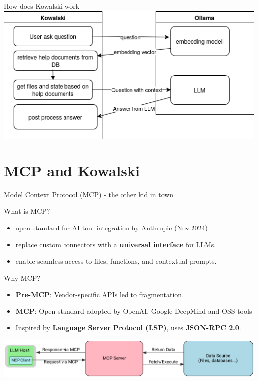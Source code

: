 \documentclass[aspectratio=169]{beamer}
\begin{document}
\begin{frame}{How does Kowalski work}
\includegraphics[width=\linewidth]{Flow.drawio}
\end{frame}
\section{MCP and Kowalski}
\begin{frame}{Model Context Protocol (MCP) - the other kid in town}
    \begin{block}{What is MCP?}
    \begin{itemize}
        \item open standard for AI-tool integration by Anthropic (Nov 2024)
        \item replace custom connectors with a \textbf{universal interface} for LLMs.
        \item enable seamless access to files, functions, and contextual prompts.
    \end{itemize}
    \end{block}
    \begin{block}{Why MCP?}
        \begin{itemize}
            \item \textbf{Pre-MCP}: Vendor-specific APIs led to fragmentation.
            \item \textbf{MCP}: Open standard adopted by OpenAI, Google DeepMind and OSS tools
            \item Inspired by \textbf{Language Server Protocol (LSP)}, uses \textbf{JSON-RPC 2.0}.
        \end{itemize}
    \end{block}
    \includegraphics[width=\linewidth]{mcp2}
\end{frame}
\end{document}
